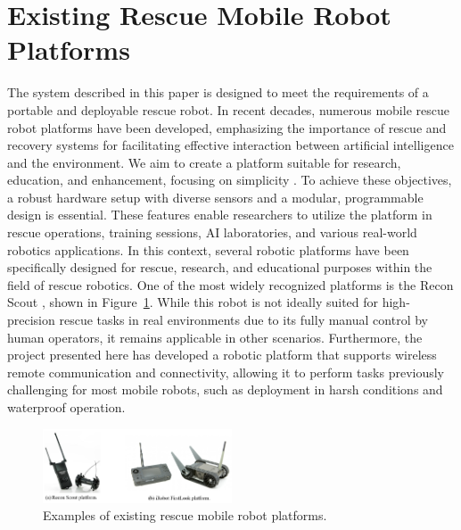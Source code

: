 \documentclass[conference]{IEEEtran}
\begin{document}
\section{Existing Rescue Mobile Robot Platforms} 
The system described in this paper is designed to meet the requirements of a portable and deployable rescue robot. In recent decades, numerous mobile rescue robot platforms have been developed, emphasizing the importance of rescue and recovery systems for facilitating effective interaction between artificial intelligence and the environment. We aim to create a platform suitable for research, education, and enhancement, focusing on simplicity \cite{Mathew2014, Karimi2017}. To achieve these objectives, a robust hardware setup with diverse sensors and a modular, programmable design is essential. These features enable researchers to utilize the platform in rescue operations, training sessions, AI laboratories, and various real-world robotics applications. In this context, several robotic platforms have been specifically designed for rescue, research, and educational purposes within the field of rescue robotics. One of the most widely recognized platforms is the Recon Scout \cite{ReconRobotics_ScoutXL, ReconRobotics_ThrowbotXT}, shown in Figure~\ref{Fig_iRobotAndRecon}. While this robot is not ideally suited for high-precision rescue tasks in real environments due to its fully manual control by human operators, it remains applicable in other scenarios. Furthermore, the project presented here has developed a robotic platform that supports wireless remote communication and connectivity, allowing it to perform tasks previously challenging for most mobile robots, such as deployment in harsh conditions and waterproof operation.

\begin{figure}[htbp] 
    \centerline{\includegraphics[width=0.5\textwidth]{Fig_iRobotAndRecon.PNG}} 
    \caption{Examples of existing rescue mobile robot platforms.} 
    \label{Fig_iRobotAndRecon} 
\end{figure}
\end{document}
